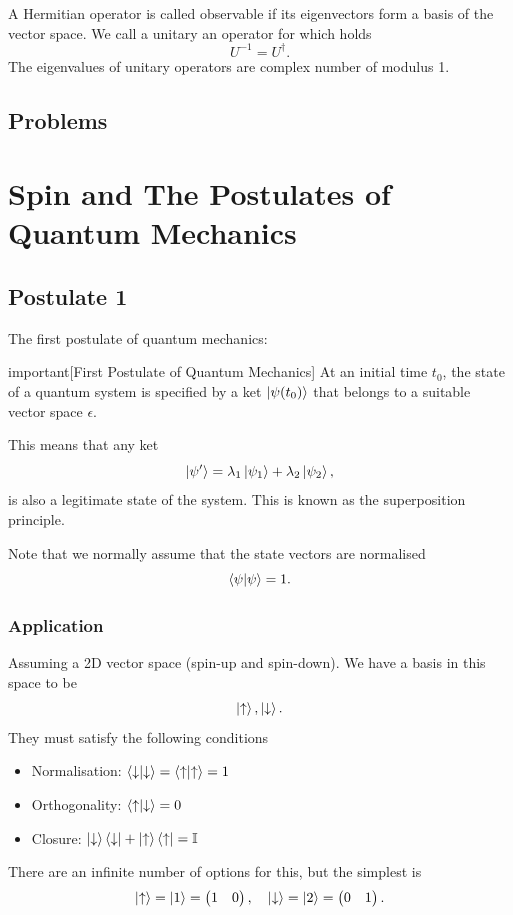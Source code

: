 \documentclass{article}
\begin{document}
A Hermitian operator is called observable if its eigenvectors form a basis of the vector space. We call a unitary an operator for which holds
\[
    U^{-1}=U^\dag.
\]
The eigenvalues of unitary operators are complex number of modulus 1.

\subsection{Problems}

\section{Spin and The Postulates of Quantum Mechanics}
\subsection{Postulate 1}
The first postulate of quantum mechanics:
\begin{callout}{important}[First Postulate of Quantum Mechanics]
\label{important:s3-p1}
At an initial time $t_0$, the state of a quantum system is specified by a ket $\ket{\psi (t_0)}$ that belongs to a suitable vector space $\epsilon $.
\end{callout}

This means that any ket
\[
    \ket{\psi '}=\lambda_{1}\ket{\psi_1 }+\lambda_2 \ket{\psi_2},
\]
is also a legitimate state of the system. This is known as the superposition principle.

Note that we normally assume that the state vectors are normalised
\[
    \braket{\psi }{\psi }=1.
\]
\subsubsection{Application}
Assuming a 2D vector space (spin-up and spin-down). We have a basis in this space to be
\[
    \ket{\uparrow},\ket{\downarrow}.
\]
They must satisfy the following conditions
\begin{itemize}
    \item Normalisation: $\braket{\downarrow}{\downarrow}=\braket{\uparrow}{\uparrow}=1$
    \item Orthogonality: $\braket{\uparrow}{\downarrow}=0$
    \item Closure: $\ket{\downarrow}\bra{\downarrow}+\ket{\uparrow}\bra{\uparrow}=\mathbb{I}$
\end{itemize}

There are an infinite number of options for this, but the simplest is
\[
    \ket{\uparrow}=\ket{1}=\begin{pmatrix}
        1 & 0
    \end{pmatrix},\quad \ket{\downarrow}=\ket{2}=\begin{pmatrix}
        0 & 1
    \end{pmatrix}.
\]
\end{document}
